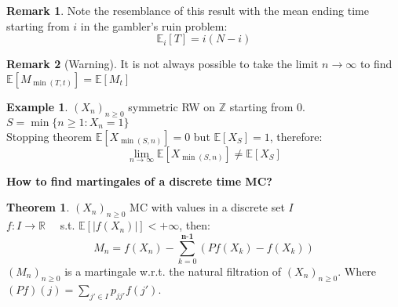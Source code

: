 \documentclass[10pt,a4paper]{article}
\theoremstyle{definition}
\newtheorem{exi}{Example}[section]
\newtheorem{teo}{Theorem}[section]
\newtheorem*{rem}{Remark}
\begin{document}
\begin{rem}
	Note the resemblance of this result with the mean ending time starting from $i$ in the gambler's ruin problem:
	\begin{equation*}                                               
		\mathbb{E}_i[T]=i(N-i)
	\end{equation*}
\end{rem}
\begin{rem}[Warning]
	It is not always possible to take the limit $n\to\infty$ to find $ \mathbb{E}[M_{\min{(T,t)}}]=\mathbb{E}[M_{t}] $
\end{rem}
\begin{exi}
	$(X_n)_{n\geq0}$ symmetric RW on $\mathbb{Z}$ starting from $0$.\\
	$S=\min{\{n\geq1: X_n=1\}}$ \\
	Stopping theorem $\mathbb{E}[X_{\min{(S,n)}}]=0 $ but $\mathbb{E}[X_{S}]=1 $, therefore:
	\begin{equation*}
		\lim_{n\to\infty}\mathbb{E}[X_{\min{(S,n)}}]\neq\mathbb{E}[X_{S}]
	\end{equation*}
\end{exi}
\textbf{How to find martingales of a discrete time MC?}
\begin{teo}
	$(X_n)_{n\geq0}$ MC with values in a discrete set $I$\\
	$f:I\to\mathbb{R}\quad $ s.t. $ \mathbb{E}[|f(X_n)|]<+\infty$, then:
	\begin{equation}
		M_n=f(X_n)-\sum_{k=0}^{\textbf{n-1}}(Pf(X_k)-f(X_k))
	\end{equation}
$(M_n)_{n\geq0}$ is a martingale w.r.t. the natural filtration of $(X_n)_{n\geq0}$.
Where $(Pf)(j)=\sum_{j'\in I}p_{jj'}f(j')$.
\end{teo}
\end{document}
